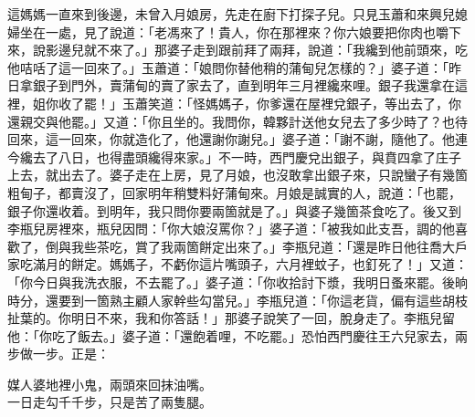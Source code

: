 這媽媽一直來到後邊，未曾入月娘房，先走在廚下打探子兒。只見玉蕭和來興兒媳婦坐在一處，見了說道：「老馮來了！貴人，你在那裡來？你六娘要把你肉也嚼下來，說影邊兒就不來了。」那婆子走到跟前拜了兩拜，說道：「我纔到他前頭來，吃他咭咶了這一回來了。」玉蕭道：「娘問你替他稍的蒲甸兒怎樣的？」婆子道：「昨日拿銀子到門外，賣蒲甸的賣了家去了，直到明年三月裡纔來哩。銀子我還拿在這裡，姐你收了罷！」玉蕭笑道：「怪媽媽子，你爹還在屋裡兌銀子，等出去了，你還親交與他罷。」又道：「你且坐的。我問你，韓夥計送他女兒去了多少時了？也待回來，這一回來，你就造化了，他還謝你謝兒。」婆子道：「謝不謝，隨他了。他連今纔去了八日，也得盡頭纔得來家。」不一時，西門慶兌出銀子，與賁四拿了庄子上去，就出去了。婆子走在上房，見了月娘，也沒敢拿出銀子來，只說蠻子有幾箇粗甸子，都賣沒了，回家明年稍雙料好蒲甸來。月娘是誠實的人，說道：「也罷，銀子你還收着。到明年，我只問你要兩箇就是了。」與婆子幾箇茶食吃了。後又到李瓶兒房裡來，瓶兒因問：「你大娘沒罵你？」婆子道：「被我如此支吾，調的他喜歡了，倒與我些茶吃，賞了我兩箇餅定出來了。」李瓶兒道：「還是昨日他往喬大戶家吃滿月的餅定。媽媽子，不虧你這片嘴頭子，六月裡蚊子，也釘死了！」又道：「你今日與我洗衣服，不去罷了。」婆子道：「你收拾討下漿，我明日蚤來罷。後晌時分，還要到一箇熟主顧人家幹些勾當兒。」李瓶兒道：「你這老貨，偏有這些胡枝扯葉的。你明日不來，我和你答話！」那婆子說笑了一回，脫身走了。李瓶兒留他：「你吃了飯去。」婆子道：「還飽着哩，不吃罷。」恐怕西門慶往王六兒家去，兩步做一步。正是：

\begin{myquote}
媒人婆地裡小鬼，兩頭來回抹油嘴。\\一日走勾千千步，只是苦了兩隻腿。
\end{myquote}

